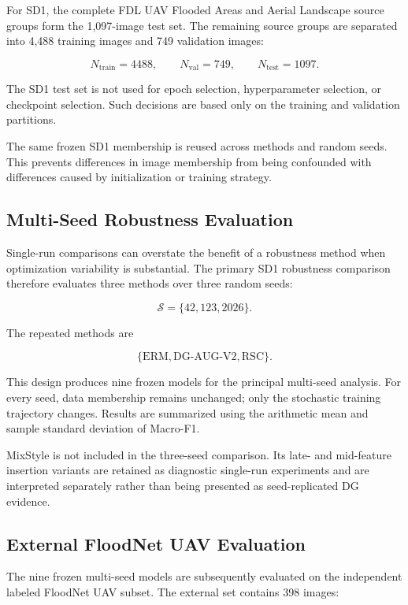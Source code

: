 For SD1, the complete FDL UAV Flooded Areas and Aerial Landscape
source groups form the 1,097-image test set. The remaining source
groups are separated into 4,488 training images and 749 validation
images:

\[
N_{\mathrm{train}}=4488,\qquad
N_{\mathrm{val}}=749,\qquad
N_{\mathrm{test}}=1097.
\]

The SD1 test set is not used for epoch selection, hyperparameter
selection, or checkpoint selection. Such decisions are based only on
the training and validation partitions.

The same frozen SD1 membership is reused across methods and random
seeds. This prevents differences in image membership from being
confounded with differences caused by initialization or training
strategy.

\subsection{Multi-Seed Robustness Evaluation}

Single-run comparisons can overstate the benefit of a robustness
method when optimization variability is substantial. The primary SD1
robustness comparison therefore evaluates three methods over three
random seeds:

\[
\mathcal{S}=\{42,123,2026\}.
\]

The repeated methods are

\[
\{
\mathrm{ERM},
\mathrm{DG\mbox{-}AUG\mbox{-}V2},
\mathrm{RSC}
\}.
\]

This design produces nine frozen models for the principal multi-seed
analysis. For every seed, data membership remains unchanged; only the
stochastic training trajectory changes. Results are summarized using
the arithmetic mean and sample standard deviation of Macro-F1.

MixStyle is not included in the three-seed comparison. Its late- and
mid-feature insertion variants are retained as diagnostic single-run
experiments and are interpreted separately rather than being presented
as seed-replicated DG evidence.

\subsection{External FloodNet UAV Evaluation}

The nine frozen multi-seed models are subsequently evaluated on the
independent labeled FloodNet UAV subset. The external set contains
398 images:

